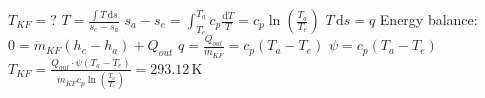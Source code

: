 \( T_{KF} = ? \)  
\( T = \frac{\int T \, \text{d}s}{s_e - s_a} \)  
\( s_a - s_e = \int_{T_e}^{T_a} c_p \frac{\text{d}T}{T} = c_p \ln \left( \frac{T_a}{T_e} \right) \)  
\( T \, \text{d}s = q \)  
Energy balance: \( 0 = \dot{m}_{KF} (h_e - h_a) + Q_{out} \)  
\( q = \frac{Q_{out}}{\dot{m}_{KF}} = c_p (T_a - T_e) \)  
\( \psi = c_p (T_a - T_e) \)  
\( T_{KF} = \frac{Q_{out} \cdot \psi (T_a - T_e)}{\dot{m}_{KF} c_p \ln \left( \frac{T_a}{T_e} \right)} = 293.12 \, \text{K} \)
